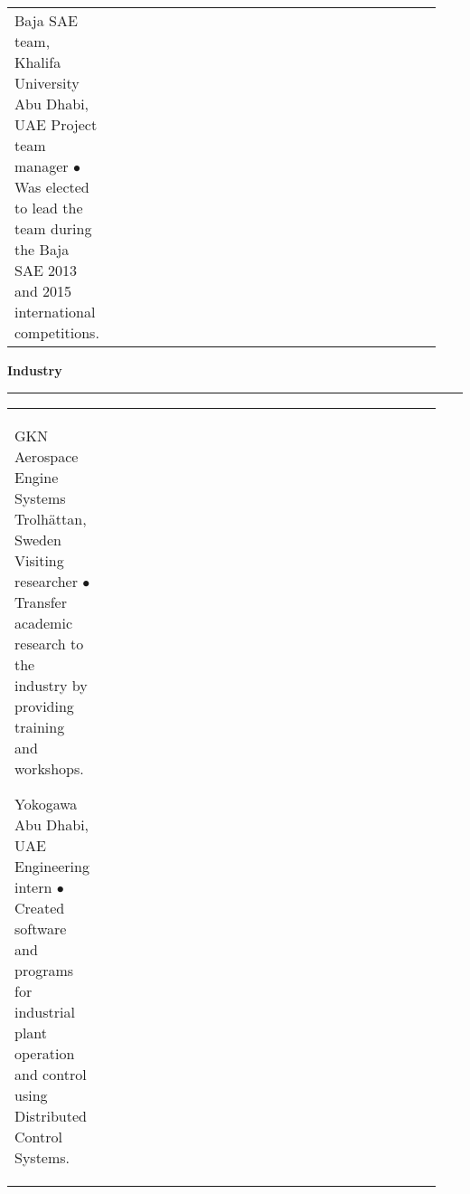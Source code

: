 \documentclass[10pt]{article} %
\begin{document}
\begin{supertabular}{>{\raggedleft\arraybackslash}p{0.17\linewidth}p{0.6\linewidth}>{\raggedleft\arraybackslash}p{0.17\linewidth}}

	{} %
	{Baja SAE team, Khalifa University} %
	{Abu Dhabi, UAE} %
	{Project team manager} %
	{$\bullet$ Was elected to lead the team during the Baja SAE 2013 and 2015 international competitions.}{} %


\end{supertabular}


\vspace{-\baselineskip}\medskip %


\textbf{\large Industry}\medskip \hrule \medskip


\begin{supertabular}{>{\raggedleft\arraybackslash}p{0.17\linewidth}p{0.6\linewidth}>{\raggedleft\arraybackslash}p{0.17\linewidth}} %


	{} %
	{GKN Aerospace Engine Systems} %
	{Trolh\"{a}ttan, Sweden} %
	{Visiting researcher} %
	{$\bullet$ Transfer academic research to the industry by providing training and workshops.}{} %


	{} %
	{Yokogawa} %
	{Abu Dhabi, UAE} %
	{Engineering intern} %
	{$\bullet$ Created software and programs for industrial plant operation and control using Distributed Control Systems.}{} %


\end{supertabular}
\end{document}
